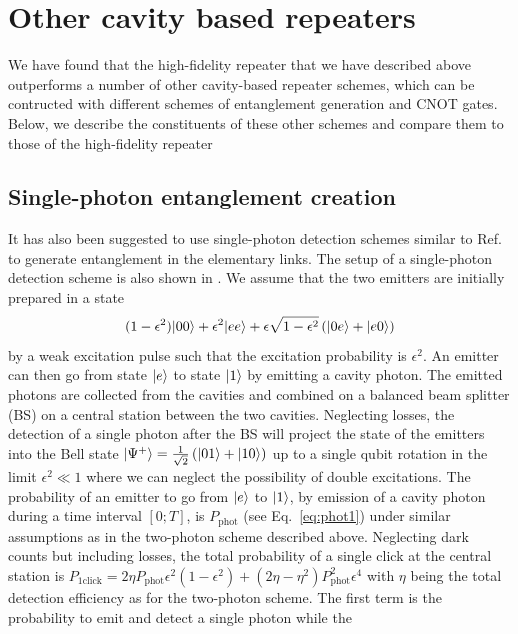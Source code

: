 \section{Other cavity based repeaters} \label{sec:other} 

We have found that the high-fidelity repeater that we have described above
outperforms a number of other cavity-based repeater schemes, which can be
contructed with different schemes of entanglement generation and CNOT gates.
Below, we describe the constituents of these other schemes and compare them to
those of the high-fidelity repeater

\subsection{Single-photon entanglement creation} \label{sec:1phot}
It has also been suggested to use single-photon detection schemes similar to
Ref.~\cite{huelga} to generate entanglement in the elementary links. The setup
of a single-photon detection scheme is also shown in . We
assume that the two emitters are initially prepared in a state
\begin{equation}
(1-\epsilon^{2})| 00 \rangle+\epsilon^{2}
| ee \rangle+\epsilon\sqrt{1-\epsilon^{2}}\left(| 0e \rangle+| e0 \rangle\right)
\end{equation}    
by a weak excitation pulse such that the excitation probability is
$\epsilon^{2}$. An emitter can then go from state $| e \rangle$ to state $| 1 \rangle$
by emitting a cavity photon. The emitted photons are collected from the cavities
and combined on a balanced beam splitter (BS) on a central station between the
two cavities. Neglecting losses, the detection of a single photon after the BS
will project the state of the emitters into the Bell state
$| \Psi^{+} \rangle=\frac{1}{\sqrt{2}}\left(| 01 \rangle+| 10 \rangle\right)$ up to a single
qubit rotation in the limit $\epsilon^{2}\ll1$ where we can neglect the
possibility of double excitations. The probability of an emitter to go from
$| e \rangle$ to $| 1 \rangle$, by emission of a cavity photon during a time interval
$[0;T]$, is $P_{\text{phot}}$ (see Eq.~\eqref{eq:phot1}) under similar
assumptions as in the two-photon scheme described above. Neglecting dark counts
but including losses, the total probability of a single click at the central
station is $P_{\text{1click}}=2\eta
P_{\text{phot}}\epsilon^{2}(1-\epsilon^{2})+(2\eta-\eta^{2})P_{\text{phot}}^{2}\epsilon^{4}$
with $\eta$ being the total detection efficiency as for the two-photon scheme.
The first term is the probability to emit and detect a single photon while the
